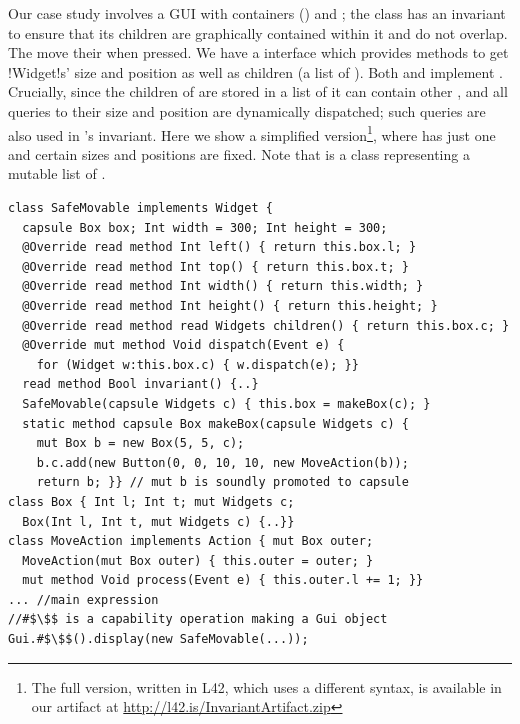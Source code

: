 Our case study involves a GUI with containers (\Q@SafeMovable@s) and \Q@Button@s;
the \Q@SafeMovable@ class has an invariant to ensure that its children are graphically contained within it and do not overlap. The \Q@Button@s move their \Q@SafeMovable@ when pressed. We have a \Q@Widget@ interface which provides methods to get \Q!Widget!s' size and position as well as children (a list of \Q@Widget@s). Both \Q@SafeMovable@s and \Q@Button@s implement \Q@Widget@. Crucially, since the children of \Q@SafeMovable@ are stored in a list of \Q@Widget@s it can contain other \Q@SafeMovable@s, and all queries to their size and position are dynamically dispatched; such queries are also used in \Q@SafeMovable@'s invariant.
Here we show a simplified version\footnote{The full version, written in L42, which uses a different syntax, is available in our artifact at \url{http://l42.is/InvariantArtifact.zip}}, where  \Q@SafeMovable@ has just one \Q@Button@ and certain sizes and positions are fixed. Note that \Q@Widgets@ is a class representing a mutable list of \Q@mut@ \Q@Widget@s.
\begin{lstlisting}
class SafeMovable implements Widget {
  capsule Box box; Int width = 300; Int height = 300;
  @Override read method Int left() { return this.box.l; }
  @Override read method Int top() { return this.box.t; }
  @Override read method Int width() { return this.width; }
  @Override read method Int height() { return this.height; }
  @Override read method read Widgets children() { return this.box.c; }
  @Override mut method Void dispatch(Event e) {
    for (Widget w:this.box.c) { w.dispatch(e); }}
  read method Bool invariant() {..}
  SafeMovable(capsule Widgets c) { this.box = makeBox(c); }
  static method capsule Box makeBox(capsule Widgets c) {
    mut Box b = new Box(5, 5, c);
    b.c.add(new Button(0, 0, 10, 10, new MoveAction(b));
    return b; }} // mut b is soundly promoted to capsule
class Box { Int l; Int t; mut Widgets c;
  Box(Int l, Int t, mut Widgets c) {..}}
class MoveAction implements Action { mut Box outer;
  MoveAction(mut Box outer) { this.outer = outer; }
  mut method Void process(Event e) { this.outer.l += 1; }}
... //main expression
//#$\$$ is a capability operation making a Gui object
Gui.#$\$$().display(new SafeMovable(...));
\end{lstlisting}%
